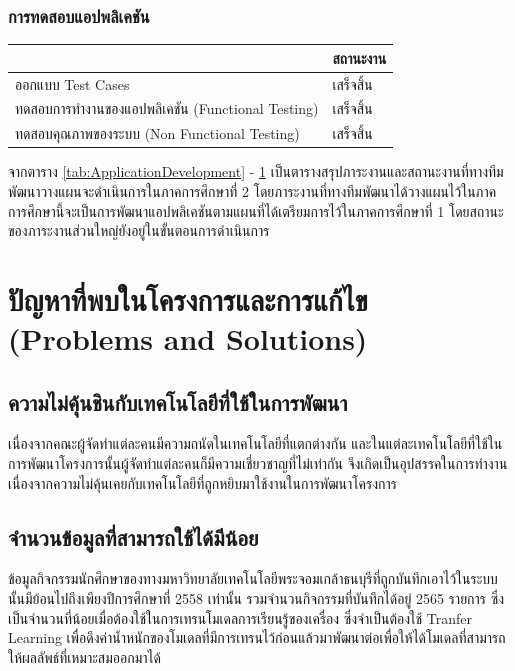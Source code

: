 \documentclass[14pt,oneside,openright,a4paper]{cpe-thai-project}
\begin{document}
    \subsubsection{การทดสอบแอปพลิเคชัน}
      \begin{table}[H]\centering
        \begin{tabular}{|l|l|}
        \hline
        \rowcolor[HTML]{9FC5E8} 
        \multicolumn{1}{|c|}{\cellcolor[HTML]{9FC5E8}ภาระงาน} & \multicolumn{1}{c|}{\cellcolor[HTML]{9FC5E8}สถานะงาน} \\ \hline
        ออกแบบ Test Cases              & \cellcolor[HTML]{34FF34}เสร็จสิ้น                     \\ \hline
        ทดสอบการทำงานของแอปพลิเคชัน (Functional Testing)              & \cellcolor[HTML]{34FF34}เสร็จสิ้น                        \\ \hline
        ทดสอบคุณภาพของระบบ (Non Functional Testing)                  & \cellcolor[HTML]{34FF34}เสร็จสิ้น                         \\ \hline
        \end{tabular}
        \label{tab:ApplicationTesting}
        \end{table}

  จากตาราง \ref{tab:ApplicationDevelopment} - \ref{tab:ApplicationTesting} เป็นตารางสรุปภาระงานและสถานะงานที่ทางทีมพัฒนาวางแผนจะดำเนินการในภาคการศึกษาที่ 2 โดยภาระงานที่ทางทีมพัฒนาได้วางแผนไว้ในภาคการศึกษานี้จะเป็นการพัฒนาแอปพลิเคชันตามแผนที่ได้เตรียมการไว้ในภาคการศึกษาที่ 1
  โดยสถานะของภาระงานส่วนใหญ่ยังอยู่ในขั้นตอนการดำเนินการ
\section{ปัญหาที่พบในโครงการและการแก้ไข (Problems and Solutions)}

\subsection{ความไม่คุ้นชินกับเทคโนโลยีที่ใช้ในการพัฒนา}
เนื่องจากคณะผู้จัดทำแต่ละคนมีความถนัดในเทคโนโลยีที่แตกต่างกัน และในแต่ละเทคโนโลยีที่ใช้ในการพัฒนาโครงการนั้นผู้จัดทำแต่ละคนก็มีความเชี่ยวชาญที่ไม่เท่ากัน 
จึงเกิดเป็นอุปสรรคในการทำงานเนื่องจากความไม่คุ้นเคยกับเทคโนโลยีที่ถูกหยิบมาใช้งานในการพัฒนาโครงการ

\subsection{จำนวนข้อมูลที่สามารถใช้ได้มีน้อย}
ข้อมูลกิจกรรมนักศึกษาของทางมหาวิทยาลัยเทคโนโลยีพระจอมเกล้าธนบุรีที่ถูกบันทึกเอาไว้ในระบบนั้นมีย้อนไปถึงเพียงปีการศึกษาที่ 2558 เท่านั้น 
รวมจำนวนกิจกรรมที่บันทึกได้อยู่ 2565 รายการ ซึ่งเป็นจำนวนที่น้อยเมื่อต้องใช้ในการเทรนโมเดลการเรียนรู้ของเครื่อง ซึ่งจำเป็นต้องใช้ Tranfer Learning 
เพื่อดึงค่าน้ำหนักของโมเดลที่มีการเทรนไว้ก่อนแล้วมาพัฒนาต่อเพื่อให้ได้โมเดลที่สามารถให้ผลลัพธ์ที่เหมาะสมออกมาได้
\end{document}
